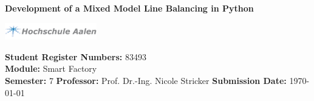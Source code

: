 \begin{center}
	
	\vspace{\baselineskip}
	
	
	\textbf{Development of a Mixed Model Line Balancing in Python}%
	
	\vspace{\baselineskip}
	
	
	\includegraphics[width=0.3\textwidth,  trim={0 0 162 0},clip]{HS_Logo.png}
	
	
\end{center}


\begin{flushleft}
	
	\vfill
	\textbf{Student Register Numbers: } 83493\\
	\textbf{Module: }Smart Factory\\
	\textbf{Semester: } 7 \linebreak
	\textbf{Professor:} Prof. Dr.-Ing. Nicole Stricker
	\linebreak \linebreak
	\textbf{Submission Date: }\today
	
\end{flushleft}

